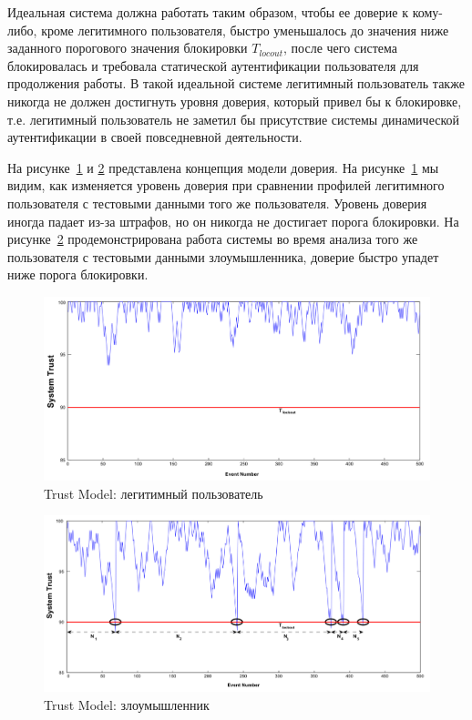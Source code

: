 \documentclass[12pt]{article}
\begin{document}
    \par Идеальная система должна работать таким образом, чтобы ее доверие к кому-либо, кроме легитимного пользователя, быстро уменьшалось до значения ниже заданного порогового значения блокировки $T_{locout}$, после чего система блокировалась и требовала статической аутентификации пользователя для продолжения работы. В такой идеальной системе легитимный пользователь также никогда не должен достигнуть уровня доверия, который привел бы к блокировке, т.е. легитимный пользователь не заметил бы присутствие системы динамической аутентификации в своей повседневной деятельности.

    \par На рисунке~\ref{sec:Overview:Model:fig:TrustModel_1} и \ref{sec:Overview:Model:fig:TrustModel_2} представлена концепция модели доверия. На рисунке~\ref{sec:Overview:Model:fig:TrustModel_1} мы видим, как изменяется уровень доверия при сравнении профилей легитимного пользователя с тестовыми данными того же пользователя. Уровень доверия иногда падает из-за штрафов, но он никогда не достигает порога блокировки. На рисунке~\ref{sec:Overview:Model:fig:TrustModel_2} продемонстрирована работа системы во время анализа того же пользователя с тестовыми данными злоумышленника, доверие быстро упадет ниже порога блокировки.

    \begin{figure}[h!]
        \centering
        \includegraphics[width=0.75\linewidth]{TrustModel_ex1.png}
        \caption{Trust Model: легитимный пользователь}
        \label{sec:Overview:Model:fig:TrustModel_1}
    \end{figure}

    \begin{figure}[h!]
        \centering
        \includegraphics[width=0.75\linewidth]{TrustModel_ex2.png}
        \caption{Trust Model: злоумышленник}
        \label{sec:Overview:Model:fig:TrustModel_2}
    \end{figure}
\end{document}

